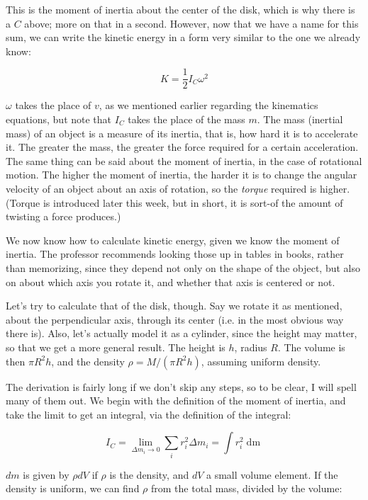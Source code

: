 This is the moment of inertia about the center of the disk, which is why there is a $C$ above; more on that in a second. However, now that we have a name for this sum, we can write the kinetic energy in a form very similar to the one we already know:

\begin{equation}
K = \frac{1}{2} I_C \omega^2
\end{equation}

$\omega$ takes the place of $v$, as we mentioned earlier regarding the kinematics equations, but note that $I_C$ takes the place of the mass $m$. The mass (inertial mass) of an object is a measure of its inertia, that is, how hard it is to accelerate it. The greater the mass, the greater the force required for a certain acceleration.\\
The same thing can be said about the moment of inertia, in the case of rotational motion. The higher the moment of inertia, the harder it is to change the angular velocity of an object about an axis of rotation, so the \emph{torque} required is higher. (Torque is introduced later this week, but in short, it is sort-of the amount of twisting a force produces.)

We now know how to calculate kinetic energy, given we know the moment of inertia. The professor recommends looking those up in tables in books, rather than memorizing, since they depend not only on the shape of the object, but also on about which axis you rotate it, and whether that axis is centered or not.

Let's try to calculate that of the disk, though. Say we rotate it as mentioned, about the perpendicular axis, through its center (i.e. in the most obvious way there is). Also, let's actually model it as a cylinder, since the height may matter, so that we get a more general result. The height is $h$, radius $R$. The volume is then $\pi R^2 h$, and the density $\rho = M/(\pi R^2 h)$, assuming uniform density.

The derivation is fairly long if we don't skip any steps, so to be clear, I will spell many of them out. We begin with the definition of the moment of inertia, and take the limit to get an integral, via the definition of the integral:

\begin{equation}
I_C = \lim_{\Delta m_i \to 0} \sum_i r_i^2 \Delta m_i = \int r_i^2 \mathop{dm}
\end{equation}

$dm$ is given by $\rho dV$ if $\rho$ is the density, and $dV$ a small volume element. If the density is uniform, we can find $\rho$ from the total mass, divided by the volume:


